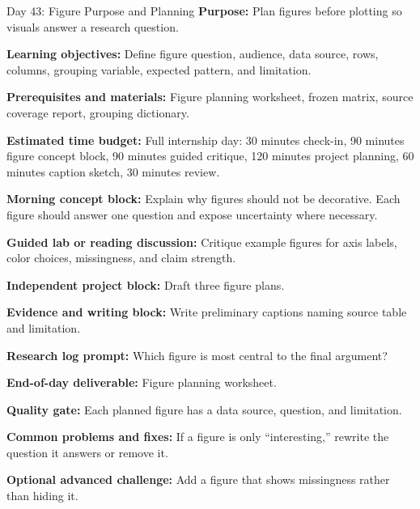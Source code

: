 \begin{dailybox}{Day 43: Figure Purpose and Planning}
\textbf{Purpose:} Plan figures before plotting so visuals answer a research question.

\textbf{Learning objectives:} Define figure question, audience, data source, rows, columns, grouping variable, expected pattern, and limitation.

\textbf{Prerequisites and materials:} Figure planning worksheet, frozen matrix, source coverage report, grouping dictionary.

\textbf{Estimated time budget:} Full internship day: 30 minutes check-in, 90 minutes figure concept block, 90 minutes guided critique, 120 minutes project planning, 60 minutes caption sketch, 30 minutes review.

\textbf{Morning concept block:} Explain why figures should not be decorative. Each figure should answer one question and expose uncertainty where necessary.

\textbf{Guided lab or reading discussion:} Critique example figures for axis labels, color choices, missingness, and claim strength.

\textbf{Independent project block:} Draft three figure plans.

\textbf{Evidence and writing block:} Write preliminary captions naming source table and limitation.

\textbf{Research log prompt:} Which figure is most central to the final argument?

\textbf{End-of-day deliverable:} Figure planning worksheet.

\textbf{Quality gate:} Each planned figure has a data source, question, and limitation.

\textbf{Common problems and fixes:} If a figure is only ``interesting,'' rewrite the question it answers or remove it.

\textbf{Optional advanced challenge:} Add a figure that shows missingness rather than hiding it.
\end{dailybox}

